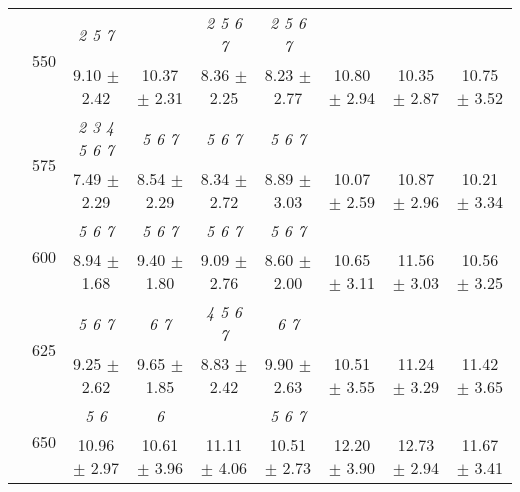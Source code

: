 \begin{table}[h]
{\begin{tabular}{
        ccccccccc}
 & \multirow{2}{*}{550}& \textit{ 2 5 7 }& & \textit{ 2 5 6 7 }& \textit{ 2 5 6 7 }& & &  \\ 
 & & 9.10 $\pm$ 2.42& 10.37 $\pm$ 2.31& 8.36 $\pm$ 2.25& 8.23 $\pm$ 2.77& 10.80 $\pm$ 2.94& 10.35 $\pm$ 2.87& 10.75 $\pm$ 3.52 \\ 
 & \multirow{2}{*}{575}& \cellcolor[HTML]{EFEFEF} \textit{ 2 3 4 5 6 7 }& \cellcolor[HTML]{EFEFEF} \textit{ 5 6 7 }& \cellcolor[HTML]{EFEFEF} \textit{ 5 6 7 }& \cellcolor[HTML]{EFEFEF} \textit{ 5 6 7 }& \cellcolor[HTML]{EFEFEF} & \cellcolor[HTML]{EFEFEF} & \cellcolor[HTML]{EFEFEF}  \\ 
 & & \cellcolor[HTML]{EFEFEF} 7.49 $\pm$ 2.29& \cellcolor[HTML]{EFEFEF} 8.54 $\pm$ 2.29& \cellcolor[HTML]{EFEFEF} 8.34 $\pm$ 2.72& \cellcolor[HTML]{EFEFEF} 8.89 $\pm$ 3.03& \cellcolor[HTML]{EFEFEF} 10.07 $\pm$ 2.59& \cellcolor[HTML]{EFEFEF} 10.87 $\pm$ 2.96& \cellcolor[HTML]{EFEFEF} 10.21 $\pm$ 3.34 \\ 
 & \multirow{2}{*}{600}& \textit{ 5 6 7 }& \textit{ 5 6 7 }& \textit{ 5 6 7 }& \textit{ 5 6 7 }& & &  \\ 
 & & 8.94 $\pm$ 1.68& 9.40 $\pm$ 1.80& 9.09 $\pm$ 2.76& 8.60 $\pm$ 2.00& 10.65 $\pm$ 3.11& 11.56 $\pm$ 3.03& 10.56 $\pm$ 3.25 \\ 
 & \multirow{2}{*}{625}& \cellcolor[HTML]{EFEFEF} \textit{ 5 6 7 }& \cellcolor[HTML]{EFEFEF} \textit{ 6 7 }& \cellcolor[HTML]{EFEFEF} \textit{ 4 5 6 7 }& \cellcolor[HTML]{EFEFEF} \textit{ 6 7 }& \cellcolor[HTML]{EFEFEF} & \cellcolor[HTML]{EFEFEF} & \cellcolor[HTML]{EFEFEF}  \\ 
 & & \cellcolor[HTML]{EFEFEF} 9.25 $\pm$ 2.62& \cellcolor[HTML]{EFEFEF} 9.65 $\pm$ 1.85& \cellcolor[HTML]{EFEFEF} 8.83 $\pm$ 2.42& \cellcolor[HTML]{EFEFEF} 9.90 $\pm$ 2.63& \cellcolor[HTML]{EFEFEF} 10.51 $\pm$ 3.55& \cellcolor[HTML]{EFEFEF} 11.24 $\pm$ 3.29& \cellcolor[HTML]{EFEFEF} 11.42 $\pm$ 3.65 \\ 
 & \multirow{2}{*}{650}& \textit{ 5 6 }& \textit{ 6 }& & \textit{ 5 6 7 }& & &  \\ 
 & & 10.96 $\pm$ 2.97& 10.61 $\pm$ 3.96& 11.11 $\pm$ 4.06& 10.51 $\pm$ 2.73& 12.20 $\pm$ 3.90& 12.73 $\pm$ 2.94& 11.67 $\pm$ 3.41 \\ \midrule 

        \bottomrule
        \end{tabular}%
        }

        \end{table}
        
